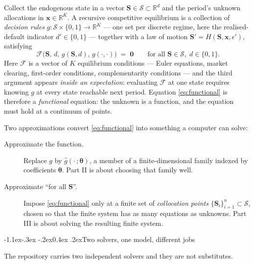 \documentclass[10pt,a4paper]{article}
\makeatletter
\theoremstyle{definition}
\theoremstyle{plain}
\theoremstyle{remark}
\newcommand{\R}{\mathbb{R}}
\newcommand{\st}{\mathbf{S}}
\newcommand{\unk}{\mathbf{x}}
\newcommand{\pol}{\bm{\theta}}
\renewcommand\subsection{\@startsection{subsection}{2}{\z@}%
  {-1.1ex\@plus -.3ex \@minus -.2ex}{0.4ex \@plus .2ex}{\normalfont\normalsize\bfseries}}
\makeatother
\begin{document}
Collect the endogenous state in a vector $\st \in \mathcal{S}\subset\R^{d}$ and the
period's unknown allocations in $\unk\in\R^{K}$. A recursive competitive equilibrium is a
collection of \emph{decision rules} $g:\mathcal{S}\times\{0,1\}\to\R^{K}$ --- one set per
discrete regime, here the realised-default indicator $d'\in\{0,1\}$ --- together with a law
of motion $\st' = H(\st,\unk,\epsilon')$, satisfying
\begin{equation}
  \boxed{\;
  \mathcal{F}\big(\st,\,d,\,g(\st,d),\,g(\cdot,\cdot)\big) \;=\; \bm{0}
  \qquad\text{for all } \st\in\mathcal{S},\; d\in\{0,1\}.}
  \label{eq:functional}
\end{equation}
Here $\mathcal{F}$ is a vector of $K$ equilibrium conditions --- Euler equations, market
clearing, first-order conditions, complementarity conditions --- and the third argument
appears \emph{inside an expectation}: evaluating $\mathcal{F}$ at one state requires knowing
$g$ at every state reachable next period. Equation \eqref{eq:functional} is therefore a
\emph{functional} equation: the unknown is a function, and the equation must hold at a
continuum of points.

Two approximations convert \eqref{eq:functional} into something a computer can solve:
\begin{description}
\item[Approximate the function.] Replace $g$ by $\hat g(\cdot\,;\pol)$, a member of a
finite-dimensional family indexed by coefficients $\pol$. Part II is about choosing that
family well.
\item[Approximate ``for all $\st$''.] Impose \eqref{eq:functional} only at a finite set of
\emph{collocation points} $\{\st_i\}_{i=1}^{n}\subset\mathcal{S}$, chosen so that the finite
system has as many equations as unknowns. Part III is about solving the resulting finite
system.
\end{description}

\subsection{Two solvers, one model, different jobs}

The repository carries two independent solvers and they are not substitutes.
\end{document}
